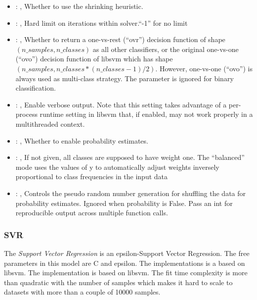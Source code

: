 \begin{itemize}
    \item {}: , 
      Whether to use the shrinking heuristic.

    \item {}: , 
      Hard limit on iterations within solver.``-1'' for no limit

    \item {}: , 
      Whether to return a one-vs-rest (``ovr'') decision function of shape $(n\_samples, n\_classes)$
      as                                                            all other classifiers, or the
      original one-vs-one (``ovo'') decision function of libsvm which has
      shape $(n\_samples, n\_classes * (n\_classes - 1) / 2)$. However, one-vs-one (``ovo'') is always
      used as                                                            multi-class strategy. The
      parameter is ignored for binary classification.

    \item {}: , 
      Enable verbose output. Note that this setting takes advantage
      of a per-process runtime setting in libsvm that, if enabled, may not
      work properly in a multithreaded context.

    \item {}: , 
      Whether to enable probability estimates.

    \item {}: \xmlDesc{[balanced]}, 
      If not given, all classes are supposed to have weight one.
      The “balanced” mode uses the values of y to automatically adjust weights
      inversely proportional to class frequencies in the input data

    \item {}: , 
      Controls the pseudo random number generation for shuffling
      the data for probability estimates. Ignored when probability is False.
      Pass an int for reproducible output across multiple function calls.
  \end{itemize}


\subsubsection{SVR}
  The  \textit{Support Vector Regression} is an epsilon-Support Vector Regression.
  The free parameters in this model are C and epsilon. The implementations is a based on libsvm.
  The implementation is based on libsvm. The fit time complexity                             is more
  than quadratic with the number of samples which makes it hard                             to scale
  to datasets with more than a couple of 10000 samples.

